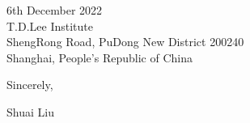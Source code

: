 \documentclass[11pt,a4paper,sans]{letter} %
\begin{document}
\begin{letter}{6th December 2022 \\
T.D.Lee Institute\\
ShengRong Road, PuDong New District 200240\\ 
Shanghai, People's Republic of China}
         
Sincerely,

Shuai Liu




\end{letter}
\end{document}
